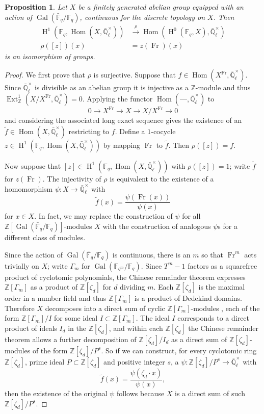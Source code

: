 \documentclass[11pt]{amsart}
\theoremstyle{plain}
\newtheorem{proposition}[theorem]{Proposition}
\theoremstyle{definition}
\theoremstyle{remark}
\newcommand{\ZZ}{{\mathbb{Z}}}
\newcommand{\EE}{\mathbb{\bar Q}_\ell}
\newcommand{\bFq}{{\mathbb{\bar F}_q}}
\newcommand{\Fq}{{\mathbb{F}_q}}
\newcommand{\Fqm}{{\mathbb{F}_{q^m}}}
\DeclareMathOperator{\Gal}{Gal}
\newcommand{\Frob}{{\operatorname{Fr}}}
\DeclareMathOperator{\Hom}{Hom}
\DeclareMathOperator{\Ext}{Ext}
\DeclareMathOperator{\Hh}{H}
\begin{document}
%
\begin{proposition}\label{prop:X}
Let $X$ be a finitely generated abelian group equipped with an action of $\Gal(\bFq/\Fq)$, continuous for the discrete topology on $X$.  Then
\begin{align*}
\Hh^1(\Fq, \Hom(X, \EE^\times)) &\xrightarrow{\rho} \Hom(\Hh^0(\Fq, X), \EE^\times) \\
\rho([z])(x) &= z(\Frob)(x)
\end{align*}
is an isomorphism of groups.
\end{proposition}
\begin{proof}
We first prove that $\rho$ is surjective.  Suppose that $f \in \Hom(X^\Frob, \EE^\times).$  Since $\EE^\times$ is divisible as an abelian group it is injective as a $\ZZ$-module and thus $\Ext^1_{\ZZ}(X/X^\Frob, \EE^\times) = 0$.  Applying the functor $\Hom(\mbox{---}, \EE^\times)$ to
$$0 \rightarrow X^\Frob \rightarrow X \rightarrow X/X^\Frob \rightarrow 0$$
and considering the associated long exact sequence gives the existence of an $\tilde{f} \in \Hom(X, \EE^\times)$ restricting to $f$.  Define a $1$-cocycle $z \in \Hh^1(\Fq, \Hom(X,\EE^\times))$ by mapping $\Frob$ to $\tilde{f}$.  Then $\rho([z]) = f$.

Now suppose that $[z] \in \Hh^1(\Fq,\Hom(X,\EE^\times))$ with $\rho([z]) = 1$; write $\tilde{f}$ for $z(\Frob)$.  The injectivity of $\rho$ is equivalent to the existence of a homomorphism $\psi \colon X \rightarrow \EE^\times$ with 
$$\tilde{f}(x) = \frac{\psi(\Frob(x))}{\psi(x)}$$
for $x \in X$.  In fact, we may replace the construction of $\psi$ for all $\ZZ[\Gal(\bFq/\Fq)]$-modules $X$ with the construction of analogous $\psi$s for a different class of modules.

Since the action of $\Gal(\bFq/\Fq)$ is continuous, there is an $m$ so that $\Frob^m$ acts trivially on $X$; write $\Gamma_m$ for $\Gal(\Fqm/\Fq)$.  Since $T^m-1$ factors as a squarefree product of cyclotomic polynomials, the Chinese remainder theorem expresses $\ZZ[\Gamma_m]$ as a product of $\ZZ[\zeta_d]$ for $d$ dividing $m$.  Each $\ZZ[\zeta_d]$ is the maximal order in a number field and thus $\ZZ[\Gamma_m]$ is a product of Dedekind domains.  Therefore $X$ decomposes into a direct sum of cyclic $\ZZ[\Gamma_m]$-modules \cite[?]{Brandal}, each of the form $\ZZ[\Gamma_m] / I$ for some ideal $I \subset \ZZ[\Gamma_m]$.  The ideal $I$ corresponds to a direct product of ideals $I_d$ in the $\ZZ[\zeta_d]$, and within each $\ZZ[\zeta_d]$ the Chinese remainder theorem allows a further decomposition of $\ZZ[\zeta_d] / I_d$ as a direct sum of $\ZZ[\zeta_d]$-modules of the form $\ZZ[\zeta_d]/P^s$.  So if we can construct, for every cyclotomic ring $\ZZ[\zeta_d]$, prime ideal $P \subset \ZZ[\zeta_d]$ and positive integer $s$, a $\psi \colon \ZZ[\zeta_d]/P^s \rightarrow \EE^\times$ with
\begin{equation} \label{eq:psi-condition}
\tilde{f}(x) = \frac{\psi(\zeta_d \cdot x)}{\psi(x)},
\end{equation}
then the existence of the original $\psi$ follows because $X$ is a direct sum of such $\ZZ[\zeta_d]/P^s$.


\end{proof}
\end{document}
